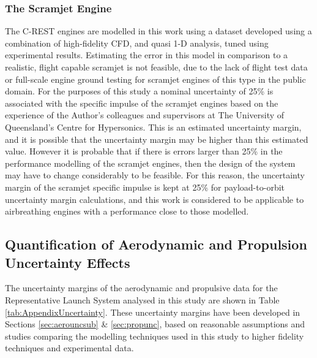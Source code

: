\subsubsection{The Scramjet Engine}


The C-REST engines are modelled in this work using a dataset developed using a combination of high-fidelity CFD, and quasi 1-D analysis, tuned using experimental results\cite{Jazra2010}. Estimating the error in this model in comparison to a realistic, flight capable scramjet is not feasible, due to the lack of flight test data or full-scale engine ground testing for scramjet engines of this type in the public domain. For the purposes of this study a nominal uncertainty of 25\% is associated with the specific impulse of the scramjet engines based on the experience of the Author's colleagues and supervisors at The University of Queensland's Centre for Hypersonics. This is an estimated uncertainty margin, and it is possible that the uncertainty margin may be higher than this estimated value. However it is probable that if there is errors larger than 25\% in the performance modelling of the scramjet engines, then the design of the system may have to change considerably to be feasible. For this reason, the uncertainty margin of the scramjet specific impulse is kept at 25\% for payload-to-orbit uncertainty margin calculations, and this work is considered to be applicable to airbreathing engines with a performance close to those modelled.


\subsection{Quantification of Aerodynamic and Propulsion Uncertainty Effects}\label{sec:uncquant}

The uncertainty margins of the aerodynamic and propulsive data for the Representative Launch System analysed in this study are shown in Table \ref{tab:AppendixUncertainty}. These uncertainty margins have been developed in Sections \ref{sec:aerouncsub} \& \ref{sec:propunc}, based on reasonable assumptions and studies comparing the modelling techniques used in this study to higher fidelity techniques and experimental data.  

